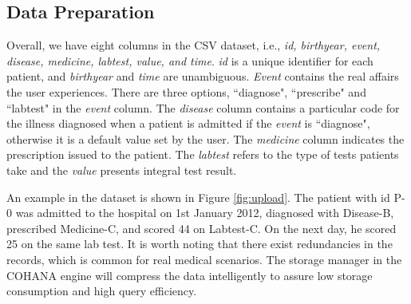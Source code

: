 \subsection{Data Preparation}

Overall, we have eight columns in the CSV dataset, i.e., \emph{id, birthyear, event, disease, medicine, labtest, value, and time}. \emph{id} is a unique identifier for each patient, and \emph{birthyear} and \emph{time} are unambiguous. 
\emph{Event} contains the real affairs the user experiences.
There are three options, ``diagnose", ``prescribe" and ``labtest" in the \emph{event} column.
The \emph{disease} column contains a particular code for the illness diagnosed when a patient is admitted if the \emph{event} is ``diagnose", otherwise it is a default value set by the user.
The \emph{medicine} column indicates the prescription issued to the patient. %
The \emph{labtest} refers to the type of tests patients take and the \emph{value} presents integral test result. 

An example in the dataset is shown in Figure \ref{fig:upload}. The patient with id P-0 was admitted to the hospital on 1st January 2012, diagnosed with Disease-B, prescribed Medicine-C, and scored 44 on Labtest-C. On the next day, he scored 25 on the same lab test. 
It is worth noting that there exist redundancies in the records, which is common for real medical scenarios. 
The storage manager in the COHANA engine will compress the data intelligently to assure low storage consumption and high query efficiency.



